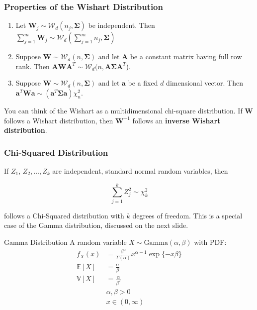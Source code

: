 \documentclass{beamer}
\begin{document}
\begin{frame}
\frametitle{Properties of the Wishart Distribution}
\begin{enumerate}
\item Let $\mathbf{W}_j \sim \mathcal{W}_d(n_j, \mathbf{\Sigma})$ be independent.  Then $\sum_{j = 1}^m \mathbf{W}_j \sim \mathcal{W}_d(\sum_{j=1}^m n_j, \mathbf{\Sigma})$
\item Suppose $\mathbf{W} \sim \mathcal{W}_d(n, \mathbf{\Sigma})$ and let $\mathbf{A}$ be a constant matrix having full row rank.  Then $\mathbf{AWA}^T \sim \mathcal{W}_d(n, \mathbf{A\Sigma A}^T$).
\item  Suppose $\mathbf{W} \sim \mathcal{W}_d(n, \mathbf{\Sigma})$ and let $\mathbf{a}$ be a fixed $d$ dimensional vector.  Then $\mathbf{a}^T\mathbf{Wa} \sim (\mathbf{a}^T\mathbf{\Sigma a})\chi^2_n$.
\end{enumerate}

You can think of the Wishart as a multidimensional chi-square distribution.  If $\mathbf{W}$ follows a Wishart distribution, then $\mathbf{W}^{-1}$ follows an \textbf{inverse Wishart distribution}.
\end{frame}

\begin{frame}
\frametitle{Chi-Squared Distribution}
If $Z_1$, $Z_2, \hdots, Z_k$ are independent, standard normal random variables, then 

$$\sum_{j = 1}^k Z_j^2 \sim \chi^2_k$$

follows a Chi-Squared distribution with $k$ degrees of freedom.  This is a special case of the Gamma distribution, discussed on the next slide.  


\end{frame}

\begin{frame}{Gamma Distribution}
A random variable $X\sim\mathrm{Gamma}(\alpha, \beta)$ with PDF:
\begin{align*}
f_{X}(x) &= \frac{\beta^{\alpha}}{\Gamma(\alpha)}x^{\alpha-1}\exp\{-x\beta\} \\
\mathbb{E}[X] &= \frac{\alpha}{\beta} \\
\mathbb{V}[X] &= \frac{\alpha}{\beta^{2}} \\
&\alpha, \beta > 0 \\
&x \in (0, \infty)
\end{align*} 
\end{frame}
\end{document}
